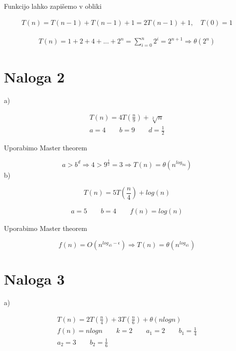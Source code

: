 \documentclass[12pt]{article}
\begin{document}
    Funkcijo lahko zapišemo v obliki

    \begin{align}
      T(n) = T(n-1) + T(n-1) + 1 = 2T(n-1) + 1,\quad T(0) = 1
    \end{align}

    \begin{equation}
      \begin{gathered}
        T(n) = 1+2+4+...+2^n = \sum_{i=0}^{n}{2^i}=2^{n+1} \Rightarrow \theta(2^n)
      \end{gathered}
    \end{equation}
    
  \section*{Naloga 2}
  a)

  \begin{equation}
    \begin{aligned}
      T(n) = 4T(\frac{n}{9}) + \sqrt[2]{n}\\
      a = 4\qquad b = 9\qquad d = \frac{1}{2}
    \end{aligned}
  \end{equation}

  Uporabimo Master theorem

  \begin{equation}
    a > b^d \Rightarrow 4 > 9^{\frac{1}{2}} = 3 \Rightarrow T(n) = \theta(n^{log_94})
  \end{equation}
  b)

  \begin{equation}
    T(n) = 5T(\frac{n}{4}) + log(n)
  \end{equation}

  \begin{align}
    a = 5\qquad b = 4\qquad f(n) = log(n)
  \end{align}

  Uporabimo Master theorem

  \begin{equation}
    f(n) = O(n^{log_45-\epsilon}) \Rightarrow T(n) = \theta(n^{log_45})
  \end{equation}

  \section*{Naloga 3}
  a)

  \begin{equation}
    \begin{aligned}
    T(n) = 2T(\frac{n}{4}) + 3T(\frac{n}{6}) + \theta(nlogn)\\
    f(n)=nlogn\qquad k = 2\qquad a_1 = 2\qquad b_1 = \frac{1}{4}\\
    a_2 = 3\qquad b_2 = \frac{1}{6}
  \end{aligned}
\end{equation}
\end{document}
